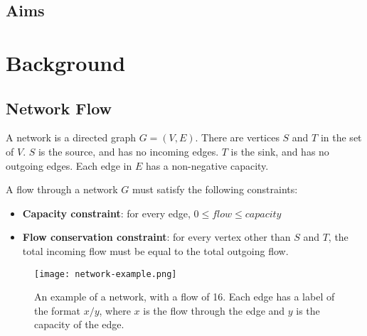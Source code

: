 \documentclass{l4proj}
\begin{document}
\section{Aims}

\begin{comment}
why should I care about what are you doing and what are you actually doing?
Animating algorithms as a learning tool. [Why do people do this? What are the benefits?]
Specific algorithm: Ford-fulkerson. [What is it? Why is this algorithm important?]
Animating ford-fulkerson as a visual aid to understanding it.
\end{comment}

\chapter{Background}

\begin{comment}
what did other people do, and how is it relevant to what you want to do?

\end{comment}
\section{Network Flow}
\begin{comment}
Background of ford-fulkerson algorithm.
\end{comment}


A network is a directed graph $G=(V, E)$. There are vertices $S$ and $T$ in the set of $V$. $S$ is the source, and has no incoming edges. $T$ is the sink, and has no outgoing edges. Each edge in $E$ has a non-negative capacity.

A flow through a network $G$ must satisfy the following constraints:

\begin{itemize}[noitemsep]
    \item \textbf{Capacity constraint}: for every edge, $0 \leq flow \leq capacity$
    \item \textbf{Flow conservation constraint}: for every vertex other than $S$ and $T$, the total incoming flow must be equal to the total outgoing flow.
\end{itemize}

\begin{figure}[h]
    \centering
    \texttt{[image: network-example.png]}
    \caption{An example of a network, with a flow of 16. Each edge has a label of the format $x/y$, where $x$ is the flow through the edge and $y$ is the capacity of the edge.}
    \label{fig:network}
\end{figure}
\end{document}
